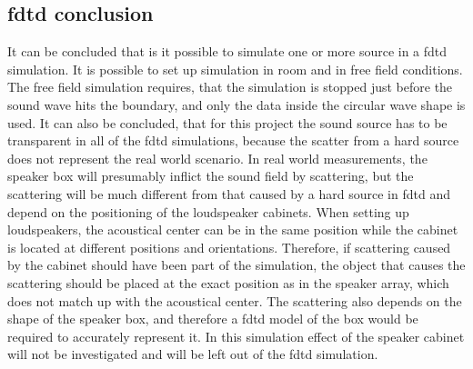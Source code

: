 \subsection{\gls{fdtd} conclusion}
It can be concluded that is it possible to simulate one or more source in a \gls{fdtd} simulation. It is possible to set up simulation in room and in free field conditions. The free field simulation requires, that the simulation is stopped just before the sound wave hits the boundary, and only the data inside the circular wave shape is used. It can also be concluded, that for this project the sound source has to be transparent in all of the \gls{fdtd} simulations, because the scatter from a hard source does not represent the real world scenario. In real world measurements, the speaker box will presumably inflict the sound field by scattering, but the scattering will be much different from that caused by a hard source in \gls{fdtd} and depend on the positioning of the loudspeaker cabinets. When setting up loudspeakers, the acoustical center can be in the same position while the cabinet is located at different positions and orientations. Therefore, if scattering caused by the cabinet should have been part of the simulation, the object that causes the scattering should be placed at the exact position as in the speaker array, which does not match up with the acoustical center. The scattering also depends on the shape of the speaker box, and therefore a \gls{fdtd} model of the box would be required to accurately represent it. In this simulation effect of the speaker cabinet will not be investigated and will be left out of the \gls{fdtd} simulation.


